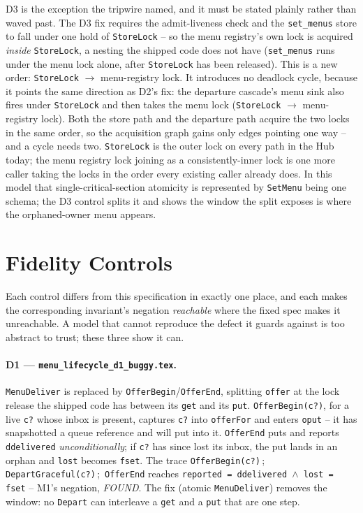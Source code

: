 \documentclass[a4paper,10pt,fleqn]{article}
\begin{document}
D3 is the exception the tripwire named, and it must be stated plainly rather
than waved past. The D3 fix requires the admit-liveness check and the
\texttt{set\_menus} store to fall under one hold of \texttt{StoreLock} -- so
the menu registry's own lock is acquired \emph{inside} \texttt{StoreLock},
a nesting the shipped code does not have (\texttt{set\_menus} runs under the
menu lock alone, after \texttt{StoreLock} has been released). This is a new
order: \texttt{StoreLock} $\to$ menu-registry lock. It introduces no
deadlock cycle, because it points the same direction as D2's fix: the
departure cascade's menu sink also fires under \texttt{StoreLock} and then
takes the menu lock (\texttt{StoreLock} $\to$ menu-registry lock). Both the
store path and the departure path acquire the two locks in the same order,
so the acquisition graph gains only edges pointing one way -- and a cycle
needs two. \texttt{StoreLock} is the outer lock on every path in the Hub
today; the menu registry lock joining as a consistently-inner lock is one
more caller taking the locks in the order every existing caller already
does. In this model that single-critical-section atomicity is represented by
\texttt{SetMenu} being one schema; the D3 control splits it and shows the
window the split exposes is where the orphaned-owner menu appears.

\section{Fidelity Controls}
\label{sec:fidelity}

Each control differs from this specification in exactly one place, and each
makes the corresponding invariant's negation \emph{reachable} where the
fixed spec makes it unreachable. A model that cannot reproduce the defect it
guards against is too abstract to trust; these three show it can.

\paragraph{D1 --- \texttt{menu\_lifecycle\_d1\_buggy.tex}.}
\label{sec:fidelity-d1}
\texttt{MenuDeliver} is replaced by \texttt{OfferBegin}/\texttt{OfferEnd},
splitting \texttt{offer} at the lock release the shipped code has between its
\texttt{get} and its \texttt{put}. \texttt{OfferBegin(c?)}, for a live
\texttt{c?} whose inbox is present, captures \texttt{c?} into
\texttt{offerFor} and enters \texttt{oput} -- it has snapshotted a queue
reference and will put into it. \texttt{OfferEnd} puts and reports
\texttt{ddelivered} \emph{unconditionally}; if \texttt{c?} has since lost its
inbox, the put lands in an orphan and \texttt{lost} becomes \texttt{fset}.
The trace \texttt{OfferBegin(c?)}\,;\,\texttt{DepartGraceful(c?)}\,;
\,\texttt{OfferEnd} reaches \texttt{reported = ddelivered $\land$ lost =
fset} -- M1's negation, \emph{FOUND}. The fix (atomic \texttt{MenuDeliver})
removes the window: no \texttt{Depart} can interleave a \texttt{get} and a
\texttt{put} that are one step.
\end{document}
